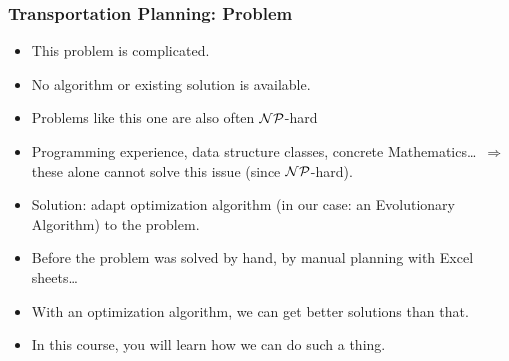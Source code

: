 \documentclass[mathserif]{beamer}%
\begin{document}
%
%
\begin{frame}%
\frametitle{Transportation Planning: Problem}%
%
\begin{itemize}%
%
\item This problem is complicated.%
%
\item<2-> No algorithm or existing solution is available.%
%
\item<3-> Problems like this one are also often \mbox{$\mathcal{NP}$-hard}%
%
\item<6-> Programming experience, data structure classes, concrete Mathematics\dots\ $\Rightarrow$ these alone cannot solve this issue (since \mbox{$\mathcal{NP}$-hard}).%
%
\item<7-> Solution: adapt optimization algorithm (in our case: an Evolutionary Algorithm) to the problem\cite{WPG2009SRWVRPWEA,WPRGG2009EFTP,WPRGG2009OGMEA,P2008IPUODGASUSMEA,M2010EAZAHTIWIW}.%
%
\item<8-> Before the problem was solved by hand, by manual planning with Excel sheets\dots%
\item<9-> With an optimization algorithm, we can get better solutions than that.%
%
\item<10-> \alert{In this course, you will learn how we can do such a thing.}%
%
\end{itemize}%
\end{frame}%
%
\end{document}
